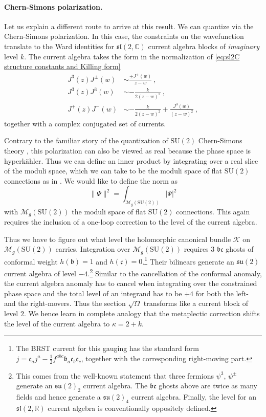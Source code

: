 \documentclass[12pt,a4paper]{article}
\newcommand{\be}{\begin{equation}}
\newcommand{\ee}{\end{equation}}
\newcommand\SU{\text{SU}}
\newcommand\CC{\mathbb{C}}
\newcommand\RR{\mathbb{R}}
\begin{document}
\paragraph{Chern-Simons polarization.} Let us explain a different route to arrive at this result. We can quantize via the Chern-Simons polarization. In this case, the constraints on the wavefunction translate to the Ward identities for $\mathfrak{sl}(2,\CC)$ current algebra blocks of \emph{imaginary} level $k$. The current algebra takes the form in the normalization of \eqref{eq:sl2C structure constants and Killing form}
\begin{subequations}
\begin{align} 
J^3(z) J^\pm(w) &\sim \frac{\pm J^\pm(w)}{z-w}~, \\
J^3(z) J^3(w) &\sim -\frac{k}{2(z-w)^2}~, \\
J^+(z) J^-(w) &\sim -\frac{k}{2(z-w)^2}+\frac{J^3(w)}{(z-w)^2}~, 
\end{align}
\end{subequations}
together with a complex conjugated set of currents. 

Contrary to the familiar story of the quantization of $\mathrm{SU}(2)$ Chern-Simons theory \cite{Witten:1988hf, Axelrod:1989xt}, this polarization can also be viewed as real because the phase space is hyperk\"ahler. Thus we can define an inner product by integrating over a real slice of the moduli space, which we can take to be the moduli space of flat $\SU(2)$ connections as in \cite{Witten:1989ip}. We would like to define the norm as
\be 
\lVert \Psi \rVert^2=\int_{\mathcal{M}_g(\SU(2))} |\Psi|^2 \label{eq:SL(2,C) current norm before metaplectic correction}
\ee
with $\mathcal{M}_g(\SU(2))$ the moduli space of flat $\SU(2)$ connections. This again requires the inclusion of a one-loop correction to the level of the current algebra.

Thus we have to figure out what level the holomorphic canonical bundle $\mathscr{K}$ on $\mathcal{M}_g(\SU(2))$ carries.  Integration over $\mathcal{M}_g(\SU(2))$ requires 3 $\mathfrak{b}\mathfrak{c}$ ghosts of conformal weight $h(\mathfrak{b})=1$ and $h(\mathfrak{c})=0$.\footnote{The BRST current for this gauging has the standard form $j=\mathfrak{c}_a j^a-\frac{1}{2} f^{abc} \mathfrak{b}_a \mathfrak{c}_b \mathfrak{c}_c$, together with the corresponding right-moving part.} Their bilinears generate an $\mathfrak{su}(2)$ current algebra of level $-4$.\footnote{This comes from the well-known statement that three fermions $\psi^3$, $\psi^\pm$ generate an $\mathfrak{su}(2)_2$ current algebra. The $\mathfrak{b}\mathfrak{c}$ ghosts above are twice as many fields and hence generate a $\mathfrak{su}(2)_4$ current algebra. Finally, the level for an $\mathfrak{sl}(2,\RR)$ current algebra is conventionally oppositely defined.} Similar to the cancellation of the conformal anomaly, the current algebra anomaly has to cancel when integrating over the constrained phase space and the total level of an integrand has to be $+4$ for both the left- and the right-movers. Thus the section $\sqrt{\Omega}$ transforms like a current block of level $2$. We hence learn in complete analogy that the metaplectic correction shifts the level of the current algebra to $\kappa=2+k$.
\end{document}
